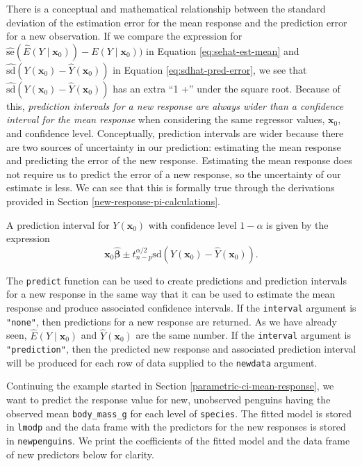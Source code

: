\documentclass[
]{book}
\theoremstyle{definition}
\theoremstyle{definition}
\theoremstyle{definition}
\theoremstyle{definition}
\theoremstyle{remark}
\begin{document}
There is a conceptual and mathematical relationship between the standard deviation of the estimation error for the mean response and the prediction error for a new observation. If we compare the expression for \(\hat{\mathrm{se}}(\hat{E}(Y\mid \mathbf{x}_0)) - E(Y\mid \mathbf{x}_0))\) in Equation \eqref{eq:sehat-est-mean} and \(\widehat{\mathrm{sd}}(Y(\mathbf{x}_0)-\hat{Y}(\mathbf{x}_0))\) in Equation \eqref{eq:sdhat-pred-error}, we see that \(\widehat{\mathrm{sd}}(Y(\mathbf{x}_0)-\hat{Y}(\mathbf{x}_0))\) has an extra ``1 +'' under the square root. Because of this, \emph{prediction intervals for a new response are always wider than a confidence interval for the mean response} when considering the same regressor values, \(\mathbf{x}_0\), and confidence level. Conceptually, prediction intervals are wider because there are two sources of uncertainty in our prediction: estimating the mean response and predicting the error of the new response. Estimating the mean response does not require us to predict the error of a new response, so the uncertainty of our estimate is less. We can see that this is formally true through the derivations provided in Section \ref{new-response-pi-calculations}.

A prediction interval for \(Y(\mathbf{x}_0)\) with confidence level \(1-\alpha\) is given by the expression
\[
\mathbf{x}_0\hat{\boldsymbol{\beta}} \pm t^{\alpha/2}_{n-p} \hat{\mathrm{sd}}(Y(\mathbf{x}_0)-\hat{Y}(\mathbf{x}_0)). \label{eq:t-pi-new-response}
\]

The \texttt{predict} function can be used to create predictions and prediction intervals for a new response in the same way that it can be used to estimate the mean response and produce associated confidence intervals. If the \texttt{interval} argument is \texttt{"none"}, then predictions for a new response are returned. As we have already seen, \(\hat{E}(Y\mid \mathbf{x}_0)\) and \(\hat{Y}(\mathbf{x}_0)\) are the same number. If the \texttt{interval} argument is \texttt{"prediction"}, then the predicted new response and associated prediction interval will be produced for each row of data supplied to the \texttt{newdata} argument.

Continuing the example started in Section \ref{parametric-ci-mean-response}, we want to predict the response value for new, unobserved penguins having the observed mean \texttt{body\_mass\_g} for each level of \texttt{species}. The fitted model is stored in \texttt{lmodp} and the data frame with the predictors for the new responses is stored in \texttt{newpenguins}. We print the coefficients of the fitted model and the data frame of new predictors below for clarity.
\end{document}

